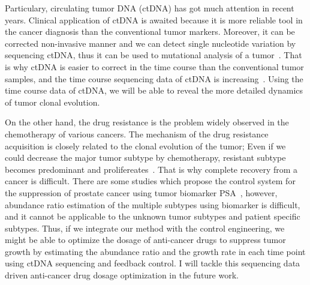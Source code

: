\documentclass{article}
\begin{document}
 Particulary, circulating tumor DNA (ctDNA) has got much attention in recent years.
 Clinical application of ctDNA is awaited because it is more reliable tool in the cancer diagnosis than the conventional tumor markers. 
 Moreover, it can be corrected non-invasive manner and we can detect single nucleotide variation by sequencing ctDNA, thus it can be used to mutational analysis of a tumor~\cite{lohr2014whole}.
 That is why ctDNA is easier to correct in the time course than the conventional tumor samples, and the time course sequencing data of ctDNA is increasing~\cite{murtaza2013non}.
 Using the time course data of ctDNA, we will be able to reveal the more detailed dynamics of tumor clonal evolution.
 
 On the other hand, the drug resistance is the problem widely observed in the chemotherapy of various cancers. The mechanism of the drug resistance acquisition is closely related to the clonal evolution of the tumor; Even if we could decrease the major tumor subtype by chemotherapy, resistant subtype becomes predominant and prolifereates~\cite{landau2014clonal}.
 That is why complete recovery from a cancer is difficult. There are some studies which propose the control system for the suppression of prostate cancer using tumor biomarker PSA~\cite{ideta2008mathematical}, however, abundance ratio estimation of the multiple subtypes using biomarker is difficult, and it cannot be applicable to the unknown tumor subtypes and patient specific subtypes.
 Thus, if we integrate our method with the control engineering, we might be able to optimize the dosage of anti-cancer drugs to suppress tumor growth by estimating the abundance ratio and the growth rate in each time point using ctDNA sequencing and feedback control.
 I will tackle this sequencing data driven anti-cancer drug dosage optimization in the future work.
\end{document}
